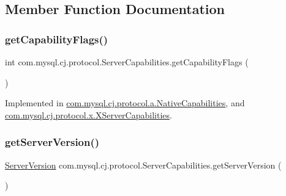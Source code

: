 \subsection{Member Function Documentation}
\mbox{\label{interfacecom_1_1mysql_1_1cj_1_1protocol_1_1_server_capabilities_a9f0922d4351d008218162eaa73d37536}} 
\subsubsection{\texorpdfstring{get\+Capability\+Flags()}{getCapabilityFlags()}}
{\footnotesize\ttfamily int com.\+mysql.\+cj.\+protocol.\+Server\+Capabilities.\+get\+Capability\+Flags (\begin{DoxyParamCaption}{ }\end{DoxyParamCaption})}



Implemented in \mbox{\hyperlink{classcom_1_1mysql_1_1cj_1_1protocol_1_1a_1_1_native_capabilities_a7448ca6f45b07ebfd3126b4fcc5ea391}{com.\+mysql.\+cj.\+protocol.\+a.\+Native\+Capabilities}}, and \mbox{\hyperlink{classcom_1_1mysql_1_1cj_1_1protocol_1_1x_1_1_x_server_capabilities_a93c9f2ed36328b3ba55670f27d16d4f7}{com.\+mysql.\+cj.\+protocol.\+x.\+X\+Server\+Capabilities}}.

\mbox{\label{interfacecom_1_1mysql_1_1cj_1_1protocol_1_1_server_capabilities_a08a31377b5af7f20476eaea763c05a15}} 
\subsubsection{\texorpdfstring{get\+Server\+Version()}{getServerVersion()}}
{\footnotesize\ttfamily \mbox{\hyperlink{classcom_1_1mysql_1_1cj_1_1_server_version}{Server\+Version}} com.\+mysql.\+cj.\+protocol.\+Server\+Capabilities.\+get\+Server\+Version (\begin{DoxyParamCaption}{ }\end{DoxyParamCaption})}



